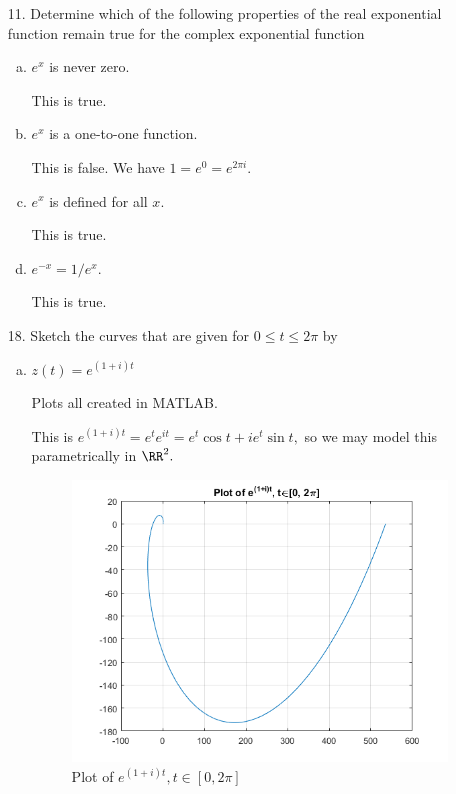 \documentclass{article}
\begin{document}
\begin{itemize}
	\item[11.] Determine which of the following properties of the real exponential function remain true for the complex exponential function
		\begin{enumerate}[(a)]
			\item $e^x$ is never zero.
				\begin{answer*}
					This is true.
				\end{answer*}

			\item $e^x$ is a one-to-one function.
				\begin{answer*}
					This is false. We have $1=e^{0}=e^{2\pi i}.$
				\end{answer*}

			\item $e^x$ is defined for all $x.$
				\begin{answer*}
					This is true.
				\end{answer*}

			\item $e^{-x}=1/e^x.$
				\begin{answer*}
					This is true.
				\end{answer*}
				
		\end{enumerate}

		\newpage
	\item[18.] Sketch the curves that are given for $0\le t\le 2\pi$ by
		\begin{enumerate}[(a)]
			\item $z(t)=e^{(1+i)t}$ 
				\begin{answer*}
					Plots all created in MATLAB.

					This is $e^{(1+i)t} = e^t e^{it} = e^t \cos t + i e^t\sin t,$ so we may model this parametrically in $\RR^2.$
					\begin{figure}[h!]
						\centering
						\includegraphics[width=10cm]{18a.png}
						\caption{Plot of $e^{(1+i)t}, t\in[0, 2\pi]$}
					\end{figure}
				\end{answer*}
				

\end{enumerate}
\end{itemize}
\end{document}
